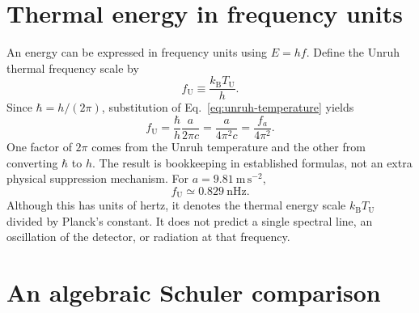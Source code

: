 \documentclass[12pt]{article}
\begin{document}
\section{Thermal energy in frequency units}

An energy can be expressed in frequency units using $E=hf$. Define the Unruh thermal frequency scale by
\begin{equation}
  f_{\mathrm{U}}\equiv\frac{k_{\mathrm{B}}T_{\mathrm{U}}}{h}.
  \label{eq:unruh-frequency-definition}
\end{equation}
Since $\hbar=h/(2\pi)$, substitution of Eq.~\eqref{eq:unruh-temperature} yields
\begin{equation}
  f_{\mathrm{U}}
  =\frac{\hbar}{h}\frac{a}{2\pi c}
  =\frac{a}{4\pi^2c}
  =\frac{f_a}{4\pi^2}.
  \label{eq:unruh-frequency}
\end{equation}
One factor of $2\pi$ comes from the Unruh temperature and the other from converting $\hbar$ to $h$. The result is bookkeeping in established formulas, not an extra physical suppression mechanism. For $a=9.81\ \mathrm{m\,s^{-2}}$,
\begin{equation}
  f_{\mathrm{U}}\simeq0.829\ \mathrm{nHz}.
  \label{eq:earth-unruh-frequency}
\end{equation}
Although this has units of hertz, it denotes the thermal energy scale $k_{\mathrm{B}}T_{\mathrm{U}}$ divided by Planck's constant. It does not predict a single spectral line, an oscillation of the detector, or radiation at that frequency.

\section{An algebraic Schuler comparison}
\end{document}
